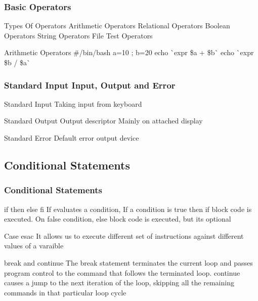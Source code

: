 \documentclass{beamer}
\begin{document}
\begin{frame}\frametitle{ Basic Operators }

\begin{block}{ Types Of Operators }
Arithmetic Operators \newline
Relational Operators \newline
Boolean Operators \newline
String Operators  \newline
File Test Operators  \newline
\end{block}
\pause
\begin{block}{ Arithmetic Operators }
\#\!/bin/bash \newline
a=10 ; b=20 \newline
echo \`{}expr \$a + \$b\`{} \newline
echo \`{}expr \$b / \$a\`{}
\end{block}

\end{frame}

\begin{frame}\frametitle{ Standard Input Input, Output and Error }

\begin{block}{ Standard Input }
Taking input from keyboard 
\end{block}
\pause

\begin{block}{ Standard Output }
Output descriptor Mainly on attached display
\end{block}
\pause
\begin{block}{ Standard Error }
Default error output device 
\end{block}

\end{frame}

\subsection{ Conditional Statements }
\begin{frame}\frametitle{ Conditional Statements }

\begin{block}{ if then else fi }
If evaluates a condition, If a condition is true then if block code is executed. On false condition, else block code is executed, but its optional
\end{block}
\pause
\begin{block}{ Case esac }
It allows us to execute different set of instructions against different values of a varaible
\end{block}
\pause
\begin{block}{ break and continue }
The break statement terminates the current loop and passes program control to the command that follows the terminated loop. \newline \pause
continue causes a jump to the next iteration of the loop, skipping all the remaining commands in that particular loop cycle
\end{block}

\end{frame}
\end{document}

